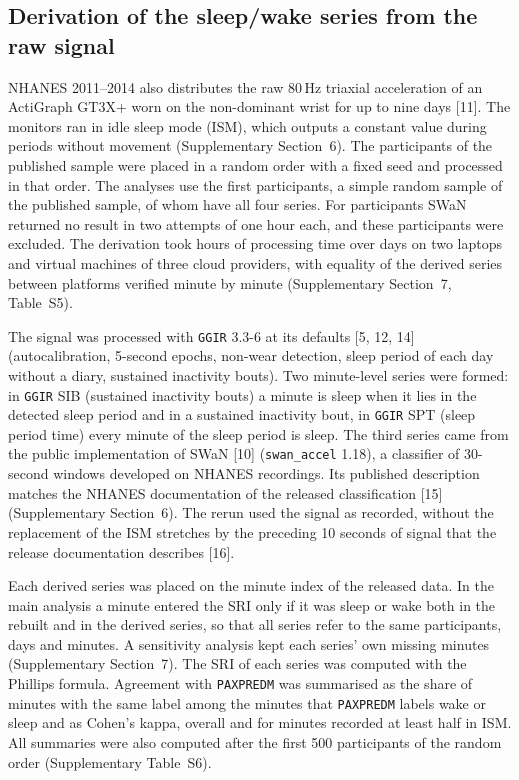 \documentclass[12pt]{article}
\begin{document}
\subsection{Derivation of the sleep/wake series from the raw signal}
\label{sec:rawmethods}
NHANES 2011--2014 also distributes the raw 80\,Hz triaxial acceleration of an
ActiGraph GT3X+ worn on the non-dominant wrist for up to nine days [11]. The monitors ran in idle sleep mode
(ISM), which outputs a constant value during periods without movement
(Supplementary Section~6).
The participants of the published sample were placed in a random order with a
fixed seed and processed in that order. The analyses use the first
\rawPrefixR{} participants, a simple random sample of the published sample, of whom \rawNsample{} have all four series. For \rawNexcl{} participants SWaN
returned no result in two attempts of one hour each, and
these participants were excluded. The derivation took
\rawComputeHours{} hours of processing time over \rawComputeDays{} days on two
laptops and virtual machines of three cloud providers, with equality of the
derived series between platforms verified minute by minute (Supplementary Section~7, Table~S5).

The signal was processed with \texttt{GGIR} 3.3-6 at its defaults
[5, 12, 14] (autocalibration, 5-second epochs, non-wear detection, sleep period of each
day without a diary, sustained inactivity bouts). Two minute-level series were formed: in \texttt{GGIR} SIB (sustained
inactivity bouts) a minute is sleep when it lies in the detected sleep period
and in a sustained inactivity bout, in \texttt{GGIR} SPT (sleep period time)
every minute of the sleep period is sleep. The third series came from the
public implementation of SWaN [10] (\texttt{swan\_accel} 1.18), a classifier of
30-second windows developed on NHANES recordings. Its published description
matches the NHANES documentation of the released classification [15] (Supplementary Section~6). The rerun used the signal as recorded, without the replacement of the ISM stretches by the preceding 10 seconds of signal that the release documentation describes [16].

Each derived series was placed on the minute index of the released data. In
the main analysis a minute entered the SRI only if it was sleep or wake both
in the rebuilt and in the derived series, so that all series refer to the same participants, days and minutes. A sensitivity analysis kept each series' own
missing minutes (Supplementary Section~7). The SRI of each series was computed
with the Phillips formula. Agreement with \texttt{PAXPREDM} was summarised as
the share of minutes with the same label among the minutes that \texttt{PAXPREDM} labels wake or sleep and as Cohen's kappa, overall and for minutes recorded at least half in ISM. All summaries were also computed after
the first 500 participants of the random order (Supplementary Table~S6).
\end{document}
